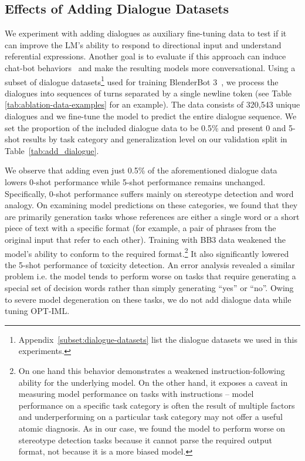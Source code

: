 \subsection{Effects of Adding Dialogue Datasets}
\label{sec:ablation_dialogue}
We experiment with adding dialogues as auxiliary fine-tuning data to test if it can improve the LM's ability to respond to directional input and understand referential expressions. Another goal is to evaluate if this approach can induce chat-bot behaviors~\citep{shuster2022blenderbot} and make the resulting models more conversational. Using a subset of dialogue datasets\footnote{Appendix~\ref{subset:dialogue-datasets} list the dialogue datasets we used in this experiments.} used for training BlenderBot 3~\citep{shuster2022blenderbot}, we process the dialogues into sequences of turns separated by a single newline token (see Table \ref{tab:ablation-data-examples} for an example). The data consists of  320,543 unique dialogues and we fine-tune the model to predict the entire dialogue sequence. We set the proportion of the included dialogue data to be 0.5\% and present 0 and 5-shot results by task category and generalization level on our validation split in  Table~\ref{tab:add_dialogue}.

We observe that adding even just 0.5\% of the aforementioned dialogue data lowers 0-shot performance while 5-shot performance remains unchanged. Specifically, 0-shot performance suffers mainly on stereotype detection and word analogy. On examining model predictions on these categories, we found that they are primarily generation tasks whose references are either a single word or a short piece of text with a specific format (for example, a pair of phrases from the original input that refer to each other). Training with BB3 data weakened the model's ability to conform to the required format.\footnote{On one hand this behavior demonstrates a weakened instruction-following ability for the underlying model. On the other hand, it exposes a caveat in measuring model performance on tasks with instructions -- model performance on a specific task category is often the result of multiple factors and underperforming on a particular task category may not offer a useful atomic diagnosis. As in our case, we found the model to perform worse on stereotype detection tasks because it cannot parse the required output format, not because it is a more biased model.} It also significantly lowered the 5-shot performance of toxicity detection. An error analysis revealed a similar problem i.e. the model tends to perform worse on tasks that require generating a special set of decision words rather than simply generating ``yes'' or ``no''. Owing to severe model degeneration on these tasks, we do not add dialogue data while tuning OPT-IML.

